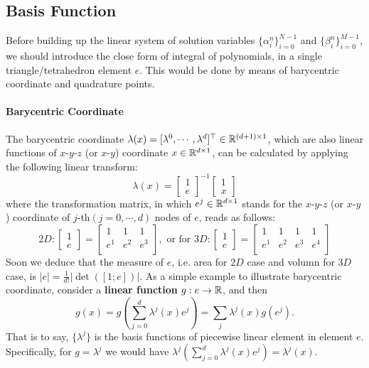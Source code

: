 \subsection{Basis Function}
Before building up the linear system of solution variables $\{\alpha_i^n\}_{i=0}^{N-1}$ and $\{\beta_i^n\}_{i=0}^{M-1}$,
we should introduce the close form of integral of polynomials,
in a single triangle/tetrahedron element $e$. 
This would be done by means of barycentric coordinate and quadrature points.

\paragraph{Barycentric Coordinate}
The barycentric coordinate 
$\lambda(x)=[\lambda^0,\cdots,\lambda^d]^\top\in\mathbb{R}^{(d+1)\times1}$, 
which are also linear functions of $x$-$y$-$z$ (or $x$-$y$) coordinate 
$x\in\mathbb{R}^{d\times1}$, can be calculated by applying the following linear transform:
\[
  \lambda(x)=
  \left[\begin{array}{c}
    1 \\
    e
  \end{array}
  \right]^{-1}
  \left[\begin{array}{c}
  1 \\
  x
\end{array}\right]
\]
where the transformation matrix, in which $e^j\in\mathbb{R}^{d\times1}$ stands for the 
$x$-$y$-$z$ (or $x$-$y$) coordinate of 
$j$-th$(j=0,\cdots,d)$ nodes of $e$, reads as follows:
\[
  2D:
  \left[\begin{array}{c}
    1 \\
    e
  \end{array}
  \right]=
\left[\begin{array}{ccc}
  1   & 1   & 1   \\
  e^1 & e^2 & e^3 \\
\end{array}
  \right]
  , \text{ or for }3D:
  \left[\begin{array}{c}
    1 \\
    e
  \end{array}
  \right]=
\left[\begin{array}{cccc}
  1   & 1   & 1   & 1   \\
  e^1 & e^2 & e^3 & e^4 \\
\end{array}
  \right]
\]
Soon we deduce that the measure of $e$, i.e. area for $2D$ case and volumn for $3D$ case, 
is $|e|=\frac{1}{d!}|\det([1;e])|$.
As a simple example to illustrate barycentric coordinate, 
consider a \textbf{linear function} $g:e\to\mathbb{R}$, and then
\[g(x)=g({\textstyle\sum_{j=0}^{d}}\lambda^j(x)e^j)=\sum_{j}\lambda^j(x)g(e^j).\]
That is to say, $\{\lambda^j\}$ is the basis functions of piecewise linear element in element $e$.
Specifically, for $g=\lambda^j$ we would have $\lambda^j(\sum_{j=0}^{d}\lambda^j(x)e^j)=\lambda^j(x)$.

